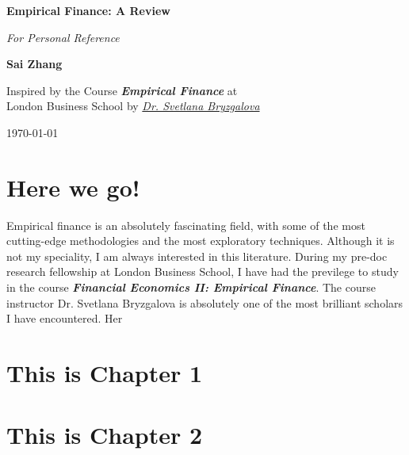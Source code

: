 \documentclass[12pt,openany]{report}
\begin{document}
\begin{titlepage}
    \begin{center}
        \vspace*{1cm}
        
        \Huge
        \textbf{Empirical Finance: A Review}

        \Large
        \textit{For Personal Reference}
            
        \vspace{2.5cm}
        
        \LARGE    
        \textbf{Sai Zhang}
            
        \vfill
        
        \large    
        Inspired by the Course \textbf{\textit{Empirical Finance}} at\\
        London Business School by \href{https://sabryzgalova.com/research/}{\textit{Dr. Svetlana Bryzgalova}}
            
        \vspace{0.8cm}
        \large
        \today
            
    \end{center}
\end{titlepage}


\chapter*{Here we go!}
Empirical finance is an absolutely fascinating field, with some of 
the most cutting-edge methodologies and the most exploratory 
techniques. Although it is not my speciality, I am always interested
in this literature. During my pre-doc research fellowship at London
Business School, I have had the previlege to study in the course
\textit{\textbf{Financial Economics II: Empirical Finance}}. The course
instructor Dr. Svetlana Bryzgalova is absolutely one of the most brilliant
scholars I have encountered. Her 

\newpage

\dominitoc
\tableofcontents

\chapter{This is Chapter 1}


\chapter{This is Chapter 2}

\end{document}
